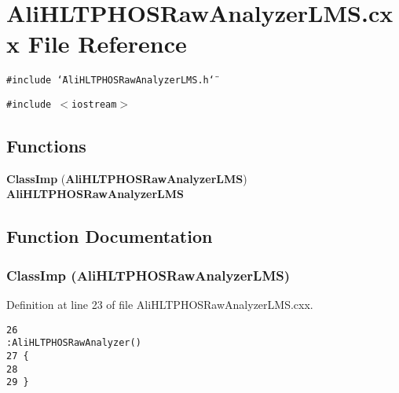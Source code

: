 \section{Ali\-HLTPHOSRaw\-Analyzer\-LMS.cxx File Reference}
\label{AliHLTPHOSRawAnalyzerLMS_8cxx}


{\tt \#include \char`\"{}Ali\-HLTPHOSRaw\-Analyzer\-LMS.h\char`\"{}}\par
{\tt \#include $<$iostream$>$}\par
\subsection*{Functions}
\begin{CompactItemize}
\item 
{\bf Class\-Imp} ({\bf Ali\-HLTPHOSRaw\-Analyzer\-LMS}) {\bf Ali\-HLTPHOSRaw\-Analyzer\-LMS}
\end{CompactItemize}


\subsection{Function Documentation}
\subsubsection{\setlength{\rightskip}{0pt plus 5cm}Class\-Imp ({\bf Ali\-HLTPHOSRaw\-Analyzer\-LMS})}\label{AliHLTPHOSRawAnalyzerLMS_8cxx_a0}




Definition at line 23 of file Ali\-HLTPHOSRaw\-Analyzer\-LMS.cxx.

\footnotesize\begin{verbatim}26                                                                                  :AliHLTPHOSRawAnalyzer()
27 {
28 
29 }
\end{verbatim}\normalsize 


